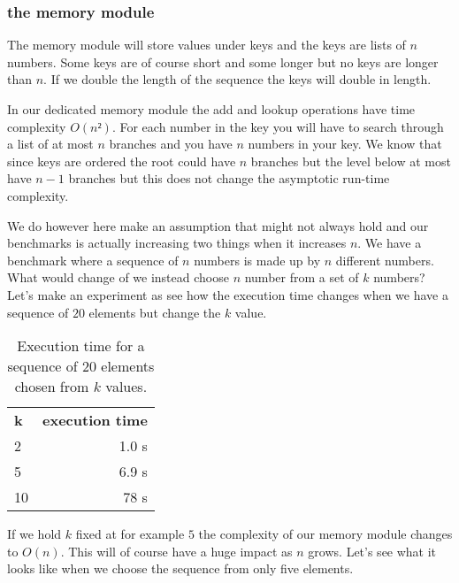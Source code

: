 \documentclass[a4paper,11pt]{article}
\begin{document}
\subsubsection*{the memory module}

The memory module will store values under keys and the keys are lists
of $n$ numbers. Some keys are of course short and some longer but no
keys are longer than $n$. If we double the length of the sequence the
keys will double in length.

In our dedicated memory module the add and lookup operations have time
complexity $O(n²)$. For each number in the key you will have to search
through a list of at most $n$ branches and you have $n$ numbers in
your key. We know that since keys are ordered the root could have $n$
branches but the level below at most have $n-1$ branches but this does
not change the asymptotic run-time complexity.

We do however here make an assumption that might not always hold and
our benchmarks is actually increasing two things when it increases
$n$. We have a benchmark where a sequence of $n$ numbers is made up by
$n$ different numbers. What would change of we instead choose $n$
number from a set of $k$ numbers? Let's make an experiment as see how
the execution time changes when we have a sequence of $20$ elements
but change the $k$ value.

\begin{table}[h!]
  \begin{center}
    \begin{tabular}{l|r} 
      \textbf{k} & \textbf{execution time} \\
      2	 & 1.0 s\\
      5	 & 6.9 s\\
      10 & 78 s \\
    \end{tabular}
    \caption{Execution time for a sequence of 20 elements chosen from $k$ values.}
  \end{center}
\end{table}                               

If we hold $k$ fixed at for example $5$ the complexity of our memory
module changes to $O(n)$. This will of course have a huge impact as
$n$ grows. Let's see what it looks like when we choose the sequence
from only five elements.
\end{document}
